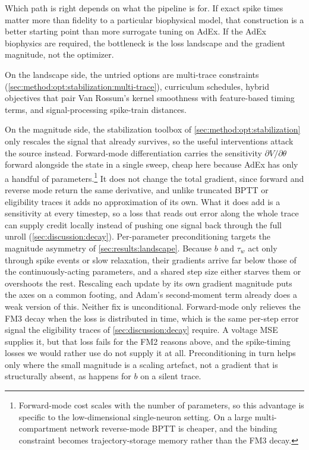 Which path is right depends on what the pipeline is for.
If exact spike times matter more than fidelity to a particular biophysical model, that construction is a better starting point than more surrogate tuning on \gls{AdEx}.
If the \gls{AdEx} biophysics are required, the bottleneck is the loss landscape and the gradient magnitude, not the optimizer.

On the landscape side, the untried options are multi-trace constraints (\cref{sec:method:opt:stabilization:multi-trace}), curriculum schedules, hybrid objectives that pair Van Rossum's kernel smoothness with feature-based timing terms, and signal-processing spike-train distances.

On the magnitude side, the stabilization toolbox of \cref{sec:method:opt:stabilization} only rescales the signal that already survives, so the useful interventions attack the source instead.
Forward-mode differentiation carries the sensitivity $\partial V/\partial\theta$ forward alongside the state in a single sweep, cheap here because \gls{AdEx} has only a handful of parameters.\footnote{Forward-mode cost scales with the number of parameters, so this advantage is specific to the low-dimensional single-neuron setting. On a large multi-compartment network reverse-mode \gls{BPTT} is cheaper, and the binding constraint becomes trajectory-storage memory rather than the FM3 decay.}
It does not change the total gradient, since forward and reverse mode return the same derivative, and unlike truncated \gls{BPTT} or eligibility traces it adds no approximation of its own.
What it does add is a sensitivity at every timestep, so a loss that reads out error along the whole trace can supply credit locally instead of pushing one signal back through the full unroll (\cref{sec:discussion:decay}).
Per-parameter preconditioning targets the magnitude asymmetry of \cref{sec:results:landscape}.
Because $b$ and $\tau_w$ act only through spike events or slow relaxation, their gradients arrive far below those of the continuously-acting parameters, and a shared step size either starves them or overshoots the rest.
Rescaling each update by its own gradient magnitude puts the axes on a common footing, and Adam's second-moment term already does a weak version of this.
Neither fix is unconditional.
Forward-mode only relieves the FM3 decay when the loss is distributed in time, which is the same per-step error signal the eligibility traces of \cref{sec:discussion:decay} require.
A voltage \gls{MSE} supplies it, but that loss fails for the FM2 reasons above, and the spike-timing losses we would rather use do not supply it at all.
Preconditioning in turn helps only where the small magnitude is a scaling artefact, not a gradient that is structurally absent, as happens for $b$ on a silent trace.

